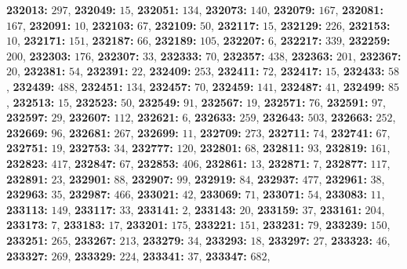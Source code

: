 \textsf{\bfseries 232013:} $297$, \textsf{\bfseries 232049:} $15$, \textsf{\bfseries 232051:} $134$, \textsf{\bfseries 232073:} $140$, \textsf{\bfseries 232079:} $167$, \textsf{\bfseries 232081:} $167$, \textsf{\bfseries 232091:} $10$, \textsf{\bfseries 232103:} $67$, \textsf{\bfseries 232109:} $50$, \textsf{\bfseries 232117:} $15$, \textsf{\bfseries 232129:} $226$, \textsf{\bfseries 232153:} $10$, \textsf{\bfseries 232171:} $151$, \textsf{\bfseries 232187:} $66$, \textsf{\bfseries 232189:} $105$, \textsf{\bfseries 232207:} $6$, \textsf{\bfseries 232217:} $339$, \textsf{\bfseries 232259:} $200$, \textsf{\bfseries 232303:} $176$, \textsf{\bfseries 232307:} $33$, \textsf{\bfseries 232333:} $70$, \textsf{\bfseries 232357:} $438$, \textsf{\bfseries 232363:} $201$, \textsf{\bfseries 232367:} $20$, \textsf{\bfseries 232381:} $54$, \textsf{\bfseries 232391:} $22$, \textsf{\bfseries 232409:} $253$, \textsf{\bfseries 232411:} $72$, \textsf{\bfseries 232417:} $15$, \textsf{\bfseries 232433:} $58$, \textsf{\bfseries 232439:} $488$, \textsf{\bfseries 232451:} $134$, \textsf{\bfseries 232457:} $70$, \textsf{\bfseries 232459:} $141$, \textsf{\bfseries 232487:} $41$, \textsf{\bfseries 232499:} $85$, \textsf{\bfseries 232513:} $15$, \textsf{\bfseries 232523:} $50$, \textsf{\bfseries 232549:} $91$, \textsf{\bfseries 232567:} $19$, \textsf{\bfseries 232571:} $76$, \textsf{\bfseries 232591:} $97$, \textsf{\bfseries 232597:} $29$, \textsf{\bfseries 232607:} $112$, \textsf{\bfseries 232621:} $6$, \textsf{\bfseries 232633:} $259$, \textsf{\bfseries 232643:} $503$, \textsf{\bfseries 232663:} $252$, \textsf{\bfseries 232669:} $96$, \textsf{\bfseries 232681:} $267$, \textsf{\bfseries 232699:} $11$, \textsf{\bfseries 232709:} $273$, \textsf{\bfseries 232711:} $74$, \textsf{\bfseries 232741:} $67$, \textsf{\bfseries 232751:} $19$, \textsf{\bfseries 232753:} $34$, \textsf{\bfseries 232777:} $120$, \textsf{\bfseries 232801:} $68$, \textsf{\bfseries 232811:} $93$, \textsf{\bfseries 232819:} $161$, \textsf{\bfseries 232823:} $417$, \textsf{\bfseries 232847:} $67$, \textsf{\bfseries 232853:} $406$, \textsf{\bfseries 232861:} $13$, \textsf{\bfseries 232871:} $7$, \textsf{\bfseries 232877:} $117$, \textsf{\bfseries 232891:} $23$, \textsf{\bfseries 232901:} $88$, \textsf{\bfseries 232907:} $99$, \textsf{\bfseries 232919:} $84$, \textsf{\bfseries 232937:} $477$, \textsf{\bfseries 232961:} $38$, \textsf{\bfseries 232963:} $35$, \textsf{\bfseries 232987:} $466$, \textsf{\bfseries 233021:} $42$, \textsf{\bfseries 233069:} $71$, \textsf{\bfseries 233071:} $54$, \textsf{\bfseries 233083:} $11$, \textsf{\bfseries 233113:} $149$, \textsf{\bfseries 233117:} $33$, \textsf{\bfseries 233141:} $2$, \textsf{\bfseries 233143:} $20$, \textsf{\bfseries 233159:} $37$, \textsf{\bfseries 233161:} $204$, \textsf{\bfseries 233173:} $7$, \textsf{\bfseries 233183:} $17$, \textsf{\bfseries 233201:} $175$, \textsf{\bfseries 233221:} $151$, \textsf{\bfseries 233231:} $79$, \textsf{\bfseries 233239:} $150$, \textsf{\bfseries 233251:} $265$, \textsf{\bfseries 233267:} $213$, \textsf{\bfseries 233279:} $34$, \textsf{\bfseries 233293:} $18$, \textsf{\bfseries 233297:} $27$, \textsf{\bfseries 233323:} $46$, \textsf{\bfseries 233327:} $269$, \textsf{\bfseries 233329:} $224$, \textsf{\bfseries 233341:} $37$, \textsf{\bfseries 233347:} $682$, 

